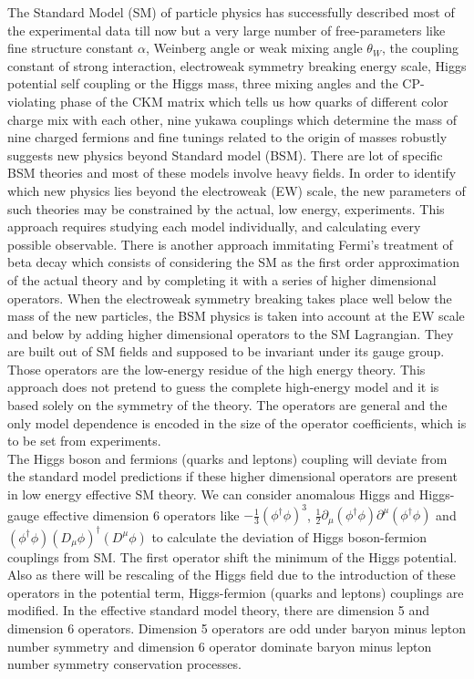\documentclass[final,3p]{CSP}
\begin{document}
\newpage

The Standard Model (SM) of particle physics has successfully described most of the experimental data till now but a very large 
number of free-parameters like fine structure constant $\alpha$, Weinberg angle or weak mixing angle $\theta_W$, the coupling 
constant of strong interaction, electroweak symmetry breaking energy scale, Higgs potential self coupling or the Higgs mass, 
three mixing angles and the CP-violating phase of the CKM matrix which tells us how quarks of 
different color charge mix with 
each other, nine yukawa couplings which determine the mass of nine charged fermions and fine 
tunings related to the origin of 
masses robustly suggests new physics beyond Standard model (BSM). There are lot of specific 
BSM theories and most of these 
models involve heavy fields. In order to identify which new physics lies beyond the 
electroweak (EW) scale, the new parameters 
of such theories may be constrained by the actual, low energy, experiments. This approach 
requires studying each model 
individually, and calculating every possible observable. There is another approach immitating 
Fermi's treatment of beta decay 
which consists of considering the SM as the first order approximation of the actual theory 
and by completing it with a series 
of higher dimensional operators. When the electroweak symmetry breaking takes place well 
below the mass of the new particles, 
the BSM physics is taken into account at the EW scale and below by adding higher dimensional 
operators to the SM Lagrangian. 
They are built out of SM fields and supposed to be invariant under its gauge group. Those 
operators are the low-energy residue 
of the high energy theory. This approach does not pretend to guess the complete high-energy 
model and it is based solely on 
the symmetry of the  theory. The operators are general and the only model dependence is 
encoded in the size of the operator 
coefficients, which is to be set from experiments.\\

The Higgs boson and fermions (quarks and leptons) coupling will deviate from the standard 
model predictions if these higher 
dimensional operators are present in low energy effective SM theory. We can consider 
anomalous Higgs and Higgs-gauge effective 
dimension 6 operators like $-\frac{1}{3}(\phi^{\dagger}\phi)^3$, $\frac{1}{2} \partial_{\mu} 
(\phi^{\dagger} \phi) 
\partial^{\mu}(\phi^{\dagger} \phi)$ and $(\phi^{\dagger} \phi)(D_{\mu} \phi)^{\dagger} 
(D^{\mu} \phi)$ to calculate the 
deviation of Higgs boson-fermion couplings from SM. The first operator shift the minimum of 
the Higgs potential. Also as there 
will be rescaling of the Higgs field due to the introduction of these operators in the 
potential term, Higgs-fermion (quarks 
and leptons) couplings are modified. In the effective standard model theory, there are 
dimension 5 and dimension 6 
operators. Dimension 5 operators are odd under baryon minus lepton number symmetry and 
dimension 6 operator dominate baryon 
minus lepton number symmetry conservation processes.\\
\end{document}
